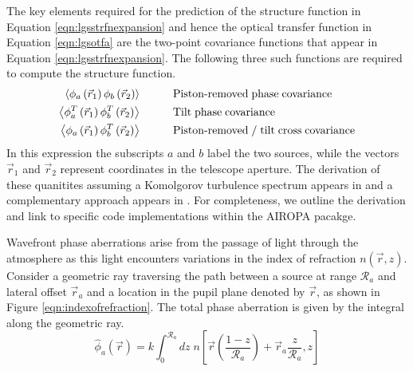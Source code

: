 The key elements required for the prediction of the structure function
in Equation \ref{eqn:lgsstrfnexpansion} and hence the optical transfer
function in Equation \ref{eqn:lgsotfa} are the two-point covariance
functions that appear in Equation \ref{eqn:lgsstrfnexpansion}.  The
following three such functions are required to compute the structure
function.
\begin{equation}\label{tpcf}
\begin{aligned}
\left\langle \phi_{a}\left(\vec{r}_{1}\right) \phi_{b}\left(\vec{r}_{2}\right) \right\rangle &\quad\quad\quad {\rm Piston\text{-}removed\;phase\;covariance} \\
\left\langle \phi^{T}_{a}\left(\vec{r}_{1}\right) \phi^{T}_{b}\left(\vec{r}_{2}\right) \right\rangle &\quad\quad\quad {\rm Tilt\;phase\;covariance} \\
\left\langle \phi_{a}\left(\vec{r}_{1}\right) \phi^{T}_{b}\left(\vec{r}_{2}\right) \right\rangle &\quad\quad\quad {\rm Piston\text{-}removed\;/\;tilt\;cross\;covariance} \\
\end{aligned}
\end{equation}
In this expression the subscripts $a$ and $b$ label the two sources,
while the vectors $\vec{r}_{1}$ and $\vec{r}_{2}$
represent coordinates in the telescope aperture.  
The derivation of these quanitites assuming a Komolgorov
turbulence spectrum appears in
\cite{Tyler:1994a} and a complementary approach appears in 
\cite{Sasiela:2012}.
For completeness, we outline the derivation and 
link to specific code implementations within the AIROPA
pacakge.

Wavefront phase aberrations arise from the passage of light through
the atmosphere as this light encounters variations in the index of
refraction $n\left(\vec{r},z\right)$.  Consider a geometric ray
traversing the path between a source at range $\mathcal{R}_{a}$ and
lateral offset $\vec{r}_{a}$ and a location in the pupil plane
denoted by $\vec{r}$, as shown in Figure
\ref{eqn:indexofrefraction}.  The total phase aberration is given by the integral
along the geometric ray.
\begin{equation}\label{eqn:totalphase_n}
\hat{\phi}_{a}\left(\vec{r}\right) = k \int_{0}^{\mathcal{R}_{a}} dz \; 
n\left[\vec{r}\left( \frac{1-z}{\mathcal{R}_{a}} \right) + \vec{r}_{a} \frac{z}{\mathcal{R}_{a}}, z\right]
\end{equation}




